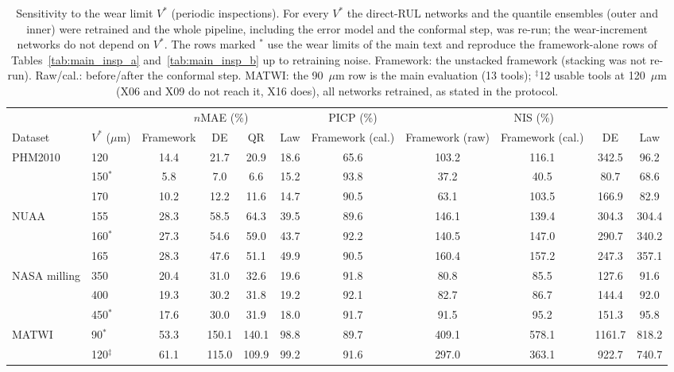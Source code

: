 \begin{table}[!htbp]
\centering
\caption{Sensitivity to the wear limit $V^\ast$ (periodic inspections). For every $V^\ast$ the direct-RUL networks and the quantile ensembles (outer and inner) were retrained and the whole pipeline, including the error model and the conformal step, was re-run; the wear-increment networks do not depend on $V^\ast$. The rows marked $^\ast$ use the wear limits of the main text and reproduce the framework-alone rows of Tables~\ref{tab:main_insp_a} and~\ref{tab:main_insp_b} up to retraining noise. Framework: the unstacked framework (stacking was not re-run). Raw/cal.: before/after the conformal step. MATWI: the 90~$\mu$m row is the main evaluation (13 tools); $^\ddagger$12 usable tools at 120~$\mu$m (X06 and X09 do not reach it, X16 does), all networks retrained, as stated in the protocol.}
\label{tab:Svstar}
\scriptsize\setlength{\tabcolsep}{3pt}
\begin{tabular}{llccccccccc}
\toprule
 & & \multicolumn{4}{c}{$n$MAE (\%)} & PICP (\%) & \multicolumn{4}{c}{NIS (\%)}\\
\cmidrule(lr){3-6}\cmidrule(lr){7-7}\cmidrule(lr){8-11}
Dataset & $V^\ast$ ($\mu$m) & Framework & DE & QR & Law & Framework (cal.) & Framework (raw) & Framework (cal.) & DE & Law\\
\midrule
PHM2010 & 120 & 14.4 & 21.7 & 20.9 & 18.6 & 65.6 & 103.2 & 116.1 & 342.5 & 96.2\\
 & 150$^\ast$ & 5.8 & 7.0 & 6.6 & 15.2 & 93.8 & 37.2 & 40.5 & 80.7 & 68.6\\
 & 170 & 10.2 & 12.2 & 11.6 & 14.7 & 90.5 & 63.1 & 103.5 & 166.9 & 82.9\\
\midrule
NUAA & 155 & 28.3 & 58.5 & 64.3 & 39.5 & 89.6 & 146.1 & 139.4 & 304.3 & 304.4\\
 & 160$^\ast$ & 27.3 & 54.6 & 59.0 & 43.7 & 92.2 & 140.5 & 147.0 & 290.7 & 340.2\\
 & 165 & 28.3 & 47.6 & 51.1 & 49.9 & 90.5 & 160.4 & 157.2 & 247.3 & 357.1\\
\midrule
NASA milling & 350 & 20.4 & 31.0 & 32.6 & 19.6 & 91.8 & 80.8 & 85.5 & 127.6 & 91.6\\
 & 400 & 19.3 & 30.2 & 31.8 & 19.2 & 92.1 & 82.7 & 86.7 & 144.4 & 92.0\\
 & 450$^\ast$ & 17.6 & 30.0 & 31.9 & 18.0 & 91.7 & 91.5 & 95.2 & 151.3 & 95.8\\
\midrule
MATWI & 90$^\ast$ & 53.3 & 150.1 & 140.1 & 98.8 & 89.7 & 409.1 & 578.1 & 1161.7 & 818.2\\
 & 120$^\ddagger$ & 61.1 & 115.0 & 109.9 & 99.2 & 91.6 & 297.0 & 363.1 & 922.7 & 740.7\\
\bottomrule
\end{tabular}
\end{table}
